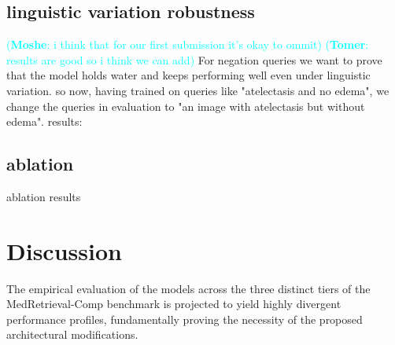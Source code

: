 \documentclass[10pt,twocolumn,letterpaper]{article}
\newcommand\mk[1]{\textcolor{cyan}{(\textbf{Moshe}: #1)}}
\newcommand\te[1]{\textcolor{cyan}{(\textbf{Tomer}: #1)}}
\begin{document}
\subsection{linguistic variation robustness}
\mk{i think that for our first submission it's okay to ommit}
\te{results are good so i think we can add}
For negation queries we want to prove that the model holds water and keeps performing well even under linguistic variation. so now, having trained on queries like "atelectasis and no edema", we change the queries in evaluation to "an image with atelectasis but without edema".
results:
\begin{table}[h]
\centering
\caption{Negation under linguistic variation.}
\label{tab:pair_label_queries}
\end{table}


\subsection{ablation}
ablation results

\section{Discussion}
The empirical evaluation of the models across the three distinct tiers of the MedRetrieval-Comp benchmark is projected to yield highly divergent performance profiles, fundamentally proving the necessity of the proposed architectural modifications.
\end{document}
